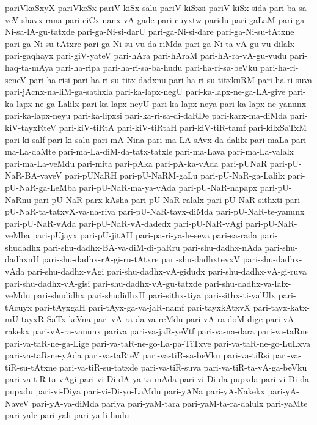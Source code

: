 {pariVkaSxyX
pariVkeSx
pariV-kiSx-salu
pariV-kiSxsi
pariV-kiSx-sida
pari-ba-sa-veV-shavx-rana
pari-ciCx-nanx-vA-gade
pari-cuyxtw
paridu
pari-gaLaM
pari-ga-Ni-sa-lA-gu-tatxde
pari-ga-Ni-si-darU
pari-ga-Ni-si-dare
pari-ga-Ni-su-tAtxne
pari-ga-Ni-su-tAtxre
pari-ga-Ni-su-vu-da-riMda
pari-ga-Ni-ta-vA-gu-vu-dilalx
pari-gaqhayx
pari-giV-yateV
pari-hAra
pari-hAraM
pari-hA-ra-vA-gu-vudu
pari-haq-ta-mAya
pari-ha-ripa
pari-ha-ri-sa-ba-hudu
pari-ha-ri-sa-beVku
pari-ha-ri-seneV
pari-ha-risi
pari-ha-ri-su-titx-dadxnu
pari-ha-ri-su-titxkuRM
pari-ha-ri-suva
pari-jAcnx-na-liM-ga-sathxla
pari-ka-lapx-negU
pari-ka-lapx-ne-ga-LA-give
pari-ka-lapx-ne-ga-Lalilx
pari-ka-lapx-neyU
pari-ka-lapx-neya
pari-ka-lapx-ne-yanunx
pari-ka-lapx-neyu
pari-ka-lipxsi
pari-ka-ri-sa-di-daRDe
pari-karx-ma-diMda
pari-kiV-tayxRteV
pari-kiV-tiRtA
pari-kiV-tiRtaH
pari-kiV-tiR-tamf
pari-kilxSaTxM
pari-ki-salf
pari-ki-salu
pari-mA-Nina
pari-ma-LA-sAvx-da-dalilx
pari-maLa
pari-ma-La-daMte
pari-ma-La-diM-da-tatx-tatxle
pari-ma-Lava
pari-ma-La-valalx
pari-ma-La-veMdu
pari-mita
pari-pAka
pari-pA-ka-vAda
pari-pUNaR
pari-pU-NaR-BA-vaveV
pari-pUNaRH
pari-pU-NaRM-gaLu
pari-pU-NaR-ga-Lalilx
pari-pU-NaR-ga-LeMba
pari-pU-NaR-ma-ya-vAda
pari-pU-NaR-napapx
pari-pU-NaRnu
pari-pU-NaR-parx-kAsha
pari-pU-NaR-ralalx
pari-pU-NaR-sithxti
pari-pU-NaR-ta-tatxvX-va-na-riva
pari-pU-NaR-tavx-diMda
pari-pU-NaR-te-yanunx
pari-pU-NaR-vAda
pari-pU-NaR-vA-dadedx
pari-pU-NaR-vAgi
pari-pU-NaR-veMba
pari-pUjayx
pari-pU-jitAH
pari-pa-ri-ya-le-seva
pari-sa-rada
pari-shudadhx
pari-shu-dadhx-BA-va-diM-di-paRru
pari-shu-dadhx-nAda
pari-shu-dadhxnU
pari-shu-dadhx-rA-gi-ru-tAtxre
pari-shu-dadhxtevxV
pari-shu-dadhx-vAda
pari-shu-dadhx-vAgi
pari-shu-dadhx-vA-gidudx
pari-shu-dadhx-vA-gi-ruva
pari-shu-dadhx-vA-gisi
pari-shu-dadhx-vA-gu-tatxde
pari-shu-dadhx-va-lalx-veMdu
pari-shudidhx
pari-shudidhxH
pari-sithx-tiya
pari-sithx-ti-yalUlx
pari-tAcuyx
pari-tAyxgaH
pari-tAyx-ga-va-jaR-namf
pari-tayxkAtxvX
pari-tayx-katx-mU-tayxR-SaTx-keVna
pari-vA-ra-da-va-reMdu
pari-vA-ra-doM-dige
pari-vA-rakekx
pari-vA-ra-vanunx
pariva
pari-va-jaR-yeVtf
pari-va-na-dara
pari-va-taRne
pari-va-taR-ne-ga-Lige
pari-va-taR-ne-go-La-pa-TiTxve
pari-va-taR-ne-go-LuLxva
pari-va-taR-ne-yAda
pari-va-taRteV
pari-va-tiR-sa-beVku
pari-va-tiRsi
pari-va-tiR-su-tAtxne
pari-va-tiR-su-tatxde
pari-va-tiR-suva
pari-va-tiR-ta-vA-ga-beVku
pari-va-tiR-ta-vAgi
pari-vi-Di-dA-ya-ta-mAda
pari-vi-Di-da-pupxda
pari-vi-Di-da-pupxdu
pari-vi-Diya
pari-vi-Di-yo-LaMdu
pari-yANa
pari-yA-Nakekx
pari-yA-NaveV
pari-yA-ya-diMda
pariya
pari-yaM-tara
pari-yaM-ta-ra-dalulx
pari-yaMte
pari-yale
pari-yali
pari-ya-li-hudu
}
